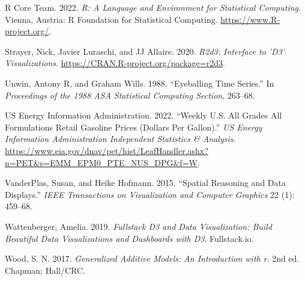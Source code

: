 \documentclass[
]{jds}
\newlength{\cslhangindent}
\newlength{\cslentryspacingunit} %
\newenvironment{CSLReferences}[2] %
 {%
  \setlength{\parindent}{0pt}
  \ifodd #1
  \let\oldpar\par
  \def\par{\hangindent=\cslhangindent\oldpar}
  \fi
  \setlength{\parskip}{#2\cslentryspacingunit}
 }%
 {}
\begin{document}
\begin{CSLReferences}{1}{0}
\leavevmode{}%
R Core Team. 2022. \emph{R: A Language and Environment for Statistical
Computing}. Vienna, Austria: R Foundation for Statistical Computing.
\url{https://www.R-project.org/}.

\leavevmode{}%
Strayer, Nick, Javier Luraschi, and JJ Allaire. 2020. \emph{R2d3:
Interface to 'D3' Visualizations}.
\url{https://CRAN.R-project.org/package=r2d3}.

\leavevmode{}%
Unwin, Antony R, and Graham Wills. 1988. {``Eyeballing Time Series.''}
In \emph{Proceedings of the 1988 ASA Statistical Computing Section},
263--68.

\leavevmode{}%
US Energy Information Administration. 2022. {``Weekly {U}.{S}. {All}
{Grades} {All} {Formulations} {Retail} {Gasoline} {Prices} ({Dollars}
Per {Gallon}).''} \emph{US Energy Information Administration Independent
Statistics \& Analysis}.
\url{https://www.eia.gov/dnav/pet/hist/LeafHandler.ashx?n=PET\&s=EMM_EPM0_PTE_NUS_DPG\&f=W}.

\leavevmode{}%
VanderPlas, Susan, and Heike Hofmann. 2015. {``Spatial Reasoning and
Data Displays.''} \emph{IEEE Transactions on Visualization and Computer
Graphics} 22 (1): 459--68.

\leavevmode{}%
Wattenberger, Amelia. 2019. \emph{Fullstack D3 and Data Visualization:
Build Beautiful Data Visualizations and Dashboards with D3}.
Fullstack.io.

\leavevmode{}%
Wood, S. N. 2017. \emph{Generalized Additive Models: An Introduction
with r}. 2nd ed. Chapman; Hall/CRC.

\end{CSLReferences}
\end{document}
